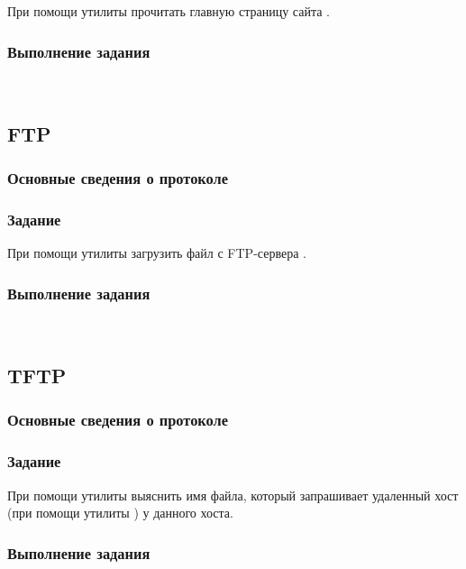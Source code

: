 При помощи утилиты  прочитать главную страницу сайта .

\subsubsection{Выполнение задания}\ 



\subsection{FTP}

\subsubsection{Основные сведения о протоколе}

\subsubsection{Задание} 

\noindent При помощи утилиты  загрузить файл с FTP-сервера .

\subsubsection{Выполнение задания}\ 



\subsection{TFTP}

\subsubsection{Основные сведения о протоколе}

\subsubsection{Задание}

При помощи утилиты  выяснить имя файла, который запрашивает удаленный хост (при помощи утилиты ) у данного хоста.

\subsubsection{Выполнение задания}\ 

